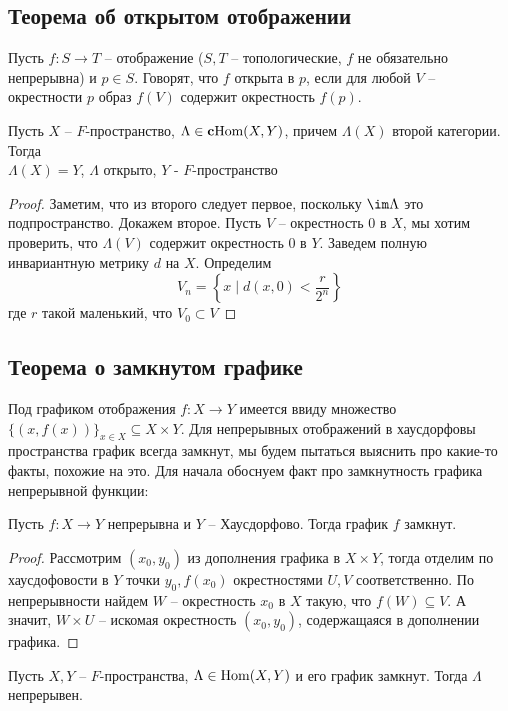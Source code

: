 \documentclass[12pt, a4paper, oneside]{book}
\begin{document}
\subsection{Теорема об открытом отображении}
Пусть $f:S \to T$ -- отображение {\footnotesize ($S,T$ -- топологические, $f$ не обязательно непрерывна)} и $p \in S$.
Говорят, что $f$ открыта в $p$, если для любой $V$ -- окрестности $p$ образ $f(V)$ содержит окрестность $f(p)$.
\begin{theorem}
   Пусть $X$ -- $F$-пространство, $\Lambda \in \text{\textbf{c}Hom}(X,Y)$, причем $\Lambda(X)$ второй категории. Тогда\\
     $\Lambda(X) = Y$, \; \; $\Lambda$ открыто,\; \; $Y$ - $F$-пространство
\end{theorem}
\begin{proof}
Заметим, что из второго следует первое, поскольку $\im \Lambda$ это подпространство. Докажем второе.
    Пусть $V$ -- окрестность 0 в $X$, мы хотим проверить, что $\Lambda(V)$ содержит окрестность 0 в $Y$. Заведем полную инвариантную метрику $d$ на $X$.
    Определим $$V_n = \left\{x\; | \; d(x,0) < \frac{r}{2^n}\right\}$$
    где $r$ такой маленький, что $V_0 \subset V$
\end{proof}


\subsection{Теорема о замкнутом графике}
Под графиком отображения $f: X \to Y$ имеется ввиду множество $\{(x,f(x))\}_{x \in X} \subseteq X \times Y$. Для непрерывных отображений в хаусдорфовы пространства график всегда замкнут, мы будем пытаться выяснить про какие-то факты, похожие на это.
Для начала обоснуем факт про замкнутность графика непрерывной функции:
\begin{remark}
Пусть $f:X \to Y$ непрерывна и $Y$ -- Хаусдорфово. Тогда график $f$ замкнут.
\end{remark}
\begin{proof}
Рассмотрим $(x_0, y_0)$ из дополнения графика в $X \times Y$, тогда отделим по хаусдофовости в $Y$ точки $y_0, f(x_0)$ окрестностями $U, V$ соответственно.
По непрерывности найдем $W$ -- окрестность $x_0$ в $X$ такую, что $f(W) \subseteq V$. А значит, $W \times U$ -- искомая окрестность $(x_0, y_0)$, содержащаяся в дополнении графика.
\end{proof}

\begin{theorem}
    Пусть $X,Y$ -- $F$-пространства, $\Lambda \in \operatorname{Hom}(X,Y)$ и его график замкнут. Тогда $\Lambda$ непрерывен.
\end{theorem}
\end{document}
